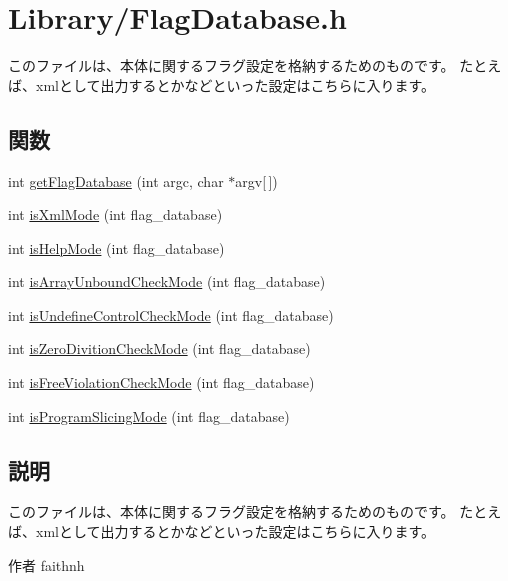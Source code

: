 \section{Library/FlagDatabase.h}
\label{FlagDatabase_8h}


このファイルは、本体に関するフラグ設定を格納するためのものです。 たとえば、xmlとして出力するとかなどといった設定はこちらに入ります。  


\subsection*{関数}
\begin{DoxyCompactItemize}
\item 
int \hyperlink{FlagDatabase_8h_a6251c68e59b9279fe6e9a633c7623a7b}{getFlagDatabase} (int argc, char $\ast$argv\mbox{[}$\,$\mbox{]})
\item 
int \hyperlink{FlagDatabase_8h_a857ab1a8518b12d818a4a721d86cd7d2}{isXmlMode} (int flag\_\-database)
\item 
int \hyperlink{FlagDatabase_8h_acb5e649e1fa4a1dd3f601c061546cfa1}{isHelpMode} (int flag\_\-database)
\item 
int \hyperlink{FlagDatabase_8h_a31ec7c6c4dadc21a358dbfb1588dc658}{isArrayUnboundCheckMode} (int flag\_\-database)
\item 
int \hyperlink{FlagDatabase_8h_a6e4f1f83cd39bb7596fe8113ac359e53}{isUndefineControlCheckMode} (int flag\_\-database)
\item 
int \hyperlink{FlagDatabase_8h_a3bf7c9c1781a4272d23e3febafba7c75}{isZeroDivitionCheckMode} (int flag\_\-database)
\item 
int \hyperlink{FlagDatabase_8h_ab2ada4a96f6c814a5a7355ecc246fc92}{isFreeViolationCheckMode} (int flag\_\-database)
\item 
int \hyperlink{FlagDatabase_8h_ad92d7f4f3f5917cf37de9cf9e0bd501f}{isProgramSlicingMode} (int flag\_\-database)
\end{DoxyCompactItemize}


\subsection{説明}
このファイルは、本体に関するフラグ設定を格納するためのものです。 たとえば、xmlとして出力するとかなどといった設定はこちらに入ります。 \begin{DoxyAuthor}{作者}
faithnh 
\end{DoxyAuthor}


